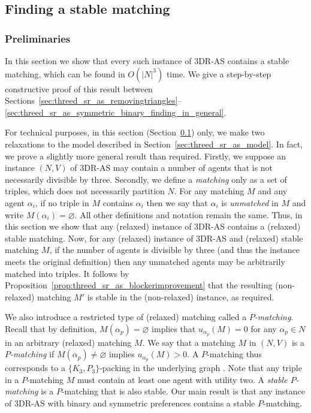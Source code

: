 \subsection{Finding a stable matching}
\label{sec:threed_sr_as_findingastablematching}

\subsubsection{Preliminaries}

In this section we show that every such instance of 3DR-AS contains a stable matching, which can be found in $O(|N|^3)$ time. We give a step-by-step constructive proof of this result between Sections~\ref{sec:threed_sr_as_removingtriangles}--\ref{sec:threed_sr_as_symmetric_binary_finding_in_general}.

For technical purposes, in this section (Section~\ref{sec:threed_sr_as_findingastablematching}) only, we make two relaxations to the model described in Section~\ref{sec:threed_sr_as_model}. In fact, we prove a slightly more general result than required. Firstly, we suppose an instance $(N, V)$ of 3DR-AS may contain a number of agents that is not necessarily divisible by three. Secondly, we define a \emph{matching} only as a set of triples, which does not necessarily partition $N$. For any matching $M$ and any agent $\alpha_i$, if no triple in $M$ contains $\alpha_i$ then we say that $\alpha_i$ is \emph{unmatched} in $M$ and write $M(\alpha_i) = \varnothing$. All other definitions and notation remain the same. Thus, in this section we show that any (relaxed) instance of 3DR-AS contains a (relaxed) stable matching. Now, for any (relaxed) instance of 3DR-AS and (relaxed) stable matching $M$, if the number of agents is divisible by three (and thus the instance meets the original definition) then any unmatched agents may be arbitrarily matched into triples. It follows by Proposition~\ref{prop:threed_sr_as_blockerimprovement} that the resulting (non-relaxed) matching $M'$ is stable in the (non-relaxed) instance, as required.

We also introduce a restricted type of (relaxed) matching called a \emph{$P$\nobreakdash-matching}. Recall that by definition, $M(\alpha_p)=\varnothing$ implies that $u_{\alpha_p}(M)=0$ for any $\alpha_p \in N$ in an arbitrary (relaxed) matching $M$. We say that a matching $M$ in $(N, V)$ is a \emph{$P$\nobreakdash-matching} if $M(\alpha_p) \neq \varnothing$ implies $u_{\alpha_p}(M) > 0$. A $P$\nobreakdash-matching thus corresponds to a $\{ K_3, P_3 \}$-packing in the underlying graph \cite{KH83}. Note that any triple in a $P$\nobreakdash-matching $M$ must contain at least one agent with utility two. A \emph{stable $P$\nobreakdash-matching} is a $P$\nobreakdash-matching that is also stable. Our main result is that any instance of 3DR-AS with binary and symmetric preferences contains a stable $P$\nobreakdash-matching.

